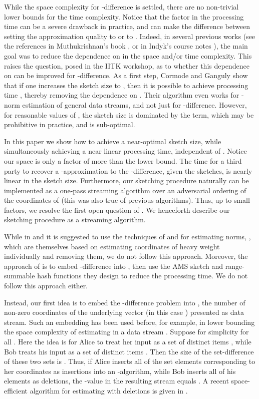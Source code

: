 \documentclass[letterpaper,11pt]{article}
\begin{document}
While the space complexity for -difference is settled, there are
no non-trivial lower bounds for the time complexity. Notice that the
 factor in the processing time can be a severe drawback in
practice, and can make the difference between setting the
approximation quality to  or to . Indeed, in
several previous works (see the references in Muthukrishnan's book
\cite{Muthu}, or in Indyk's course notes \cite{IndykCourse}), the main
goal was to reduce the dependence on  in the space
and/or time complexity. This raises
the question, posed in the IITK workshop, as to whether this
dependence on  can be improved for -difference. As a first step, Cormode and
Ganguly \cite{CG07} show that if one increases the sketch size to
, then it is possible to achieve processing
time , thereby removing the dependence on
. Their algorithm even works for -norm estimation of
general data streams, and not just for -difference.
However, for reasonable values of , the sketch size is
dominated by the  term, which may be prohibitive in
practice, and is sub-optimal.

In this paper we show how to achieve a near-optimal  sketch size, while simultaneously achieving
a near linear  processing time, independent of . Notice our
space is only a
factor of  more than the lower bound. The time for a third
party to recover a -approximation to the -difference,
given the sketches,
is nearly linear in the sketch size.
Furthermore, our
sketching procedure naturally can be implemented as a one-pass
streaming algorithm over an adversarial ordering of the coordinates of
 (this was also true of previous algorithms). 
Thus, up to small
factors, we
resolve the first open question of \cite{IITK}.
We henceforth
describe our sketching procedure as a streaming algorithm.

While in \cite{CG07} and \cite{IITK} it is suggested to use the
techniques of \cite{bgks06} and \cite{IW} for estimating  norms,
, which are themselves based on estimating coordinates of heavy
weight
individually and removing them, we do not follow this
approach. Moreover, the approach of \cite{FKSV02} is to embed
-difference into , then use the AMS sketch \cite{AMS99}
and range-summable hash functions they design
to reduce the processing time. We do not follow this approach either.

Instead, our first idea is to embed the -difference problem into
, the number of non-zero coordinates of the underlying vector 
(in this case ) presented as data stream. Such an
embedding has been used before, for example, in lower bounding the
space complexity of estimating  in a data stream
\cite{IW03}.  Suppose for simplicity  for all . Here the idea is for Alice to treat her input  as a
set of distinct items , while Bob
treats his input  as a set of distinct items . Then the size of the set-difference of these
two sets is . Thus, if Alice inserts all of the set
elements corresponding to her coordinates as insertions into an
-algorithm, while Bob inserts all of his elements as deletions,
the -value
in the resulting stream equals . A recent
space-efficient algorithm for estimating  with deletions
is given in \cite{KNW08}.
\end{document}
